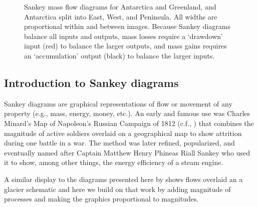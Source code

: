 \documentclass[jog]{igs}
\begin{document}
\begin{figure}
\caption{Sankey mass flow diagrams for Antarctica and Greenland, and Antarctica split into East, West, and Peninsula. All widths are proportional within and between images. Because Sankey diagrams balance all inputs and outputs, mass losses require a `drawdown' input (red) to balance the larger outputs, and mass gains requires an `accumulation' output (black) to balance the larger inputs.}
\label{fig}
\end{figure}

\subsection{Introduction to Sankey diagrams}

Sankey diagrams are graphical representations of flow or movement of any property (e.g., mass, energy, money, etc.). An early and famous use was Charles Minard's Map of Napoleon's Russian Campaign of 1812 (c.f., \citet{kraak_2021}) that combines the magnitude of active soldiers overlaid on a geographical map to show attrition during one battle in a war. The method was later refined, popularized, and eventually named after Captain Matthew Henry Phineas Riall Sankey who used it to show, among other things, the energy efficiency of a steam engine.

A similar display to the diagrams presented here by \citet[Fig. 2]{cogley_2011} shows flows overlaid an a glacier schematic and here we build on that work by adding magnitude of processes and making the graphics proportional to magnitudes.
\end{document}
